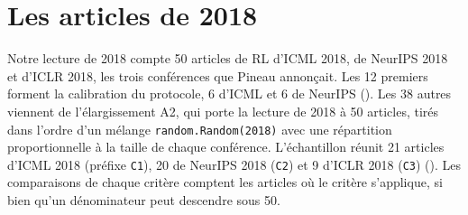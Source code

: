 
\section{Les articles de 2018}
\label{sec:c-2018}

Notre lecture de 2018 compte 50 articles de RL d'ICML 2018, de NeurIPS 2018 et d'ICLR 2018, les trois
conférences que Pineau annonçait. Les 12 premiers forment la calibration du protocole, 6 d'ICML et
6 de NeurIPS (). Les 38 autres viennent de l'élargissement A2, qui porte la lecture de 2018 à 50 articles, tirés
dans l'ordre d'un mélange \texttt{random.Random(2018)} avec une répartition proportionnelle à la
taille de chaque conférence. L'échantillon réunit 21 articles d'ICML 2018 (préfixe
\texttt{C1}), 20 de NeurIPS 2018 (\texttt{C2}) et 9 d'ICLR 2018 (\texttt{C3})
(). Les comparaisons de chaque critère comptent les articles où le
critère s'applique, si bien qu'un dénominateur peut descendre sous 50.

